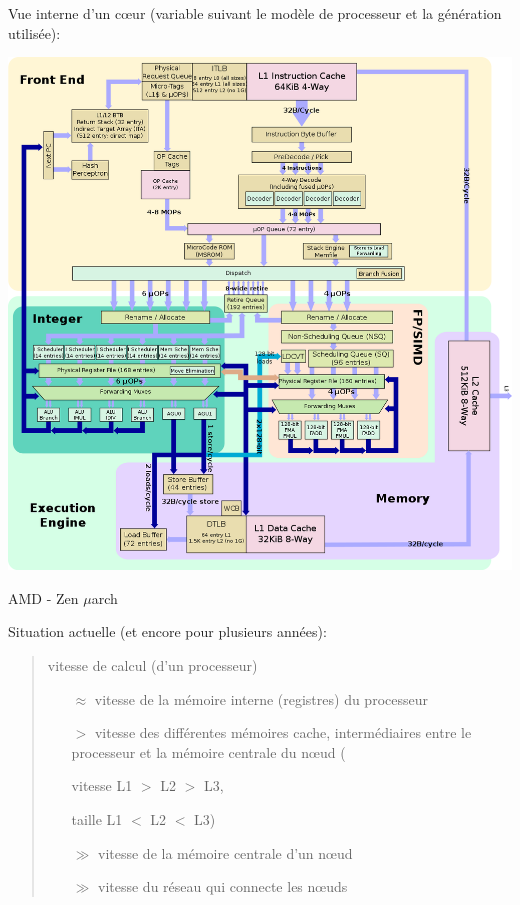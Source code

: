 \documentclass{beamer}
\begin{document}
\begin{frame}
Vue interne d'un c\oe ur (variable suivant le mod\`ele de processeur et la g\'en\'eration utilis\'ee):

\begin{center}
	\includegraphics[scale=0.18]{../Images/1106px-zen_block_diagram}
	
	AMD - Zen $\mu$arch
\end{center}

\end{frame}

\begin{frame}[fragile]
Situation actuelle (et encore pour plusieurs ann\'ees): 
\begin{quote}
	
	\vfill
	vitesse de calcul (d'un processeur)
	\vfill
	
	\begin{itemize}
		\item[$\approx$] vitesse de la m\'emoire interne (registres) du processeur
			\medskip
	        
		\item[$>$] vitesse des diff\'erentes m\'emoires cache, interm\'ediaires entre le processeur et la m\'emoire centrale du n\oe ud (
		
		\hfill vitesse L1 $>$ L2 $>$ L3, 
		
		\hfill taille L1 $<$ L2 $<$ L3)
			\medskip
			
		\item[$\gg$] vitesse de la m\'emoire centrale d'un n\oe ud
			\medskip
			
		\item[$\gg$] vitesse du r\'eseau qui connecte les n\oe uds
	\end{itemize}


\end{quote}

\end{frame}
\end{document}
